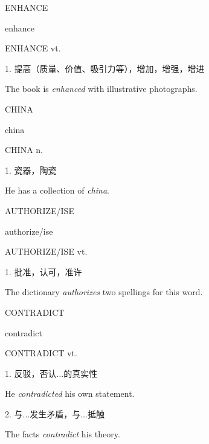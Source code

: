 \begin{flashcard}{
ENHANCE

enhance
}
\begin{center}
ENHANCE vt. 
\end{center}
1. 提高（质量、价值、吸引力等），增加，增强，增进

The book is \textit{enhanced} with illustrative photographs.

\end{flashcard}
\begin{flashcard}{
CHINA

china
}
\begin{center}
CHINA n. 
\end{center}
1. 瓷器，陶瓷

He has a collection of \textit{china}.

\end{flashcard}
\begin{flashcard}{
AUTHORIZE/ISE

authorize/ise
}
\begin{center}
AUTHORIZE/ISE vt. 
\end{center}
1. 批准，认可，准许

The dictionary \textit{authorizes} two spellings for this word.

\end{flashcard}
\begin{flashcard}{
CONTRADICT

contradict
}
\begin{center}
CONTRADICT vt. 
\end{center}
1. 反驳，否认...的真实性

He \textit{contradicted} his own statement.

2. 与...发生矛盾，与...抵触

The facts \textit{contradict} his theory.

\end{flashcard}
